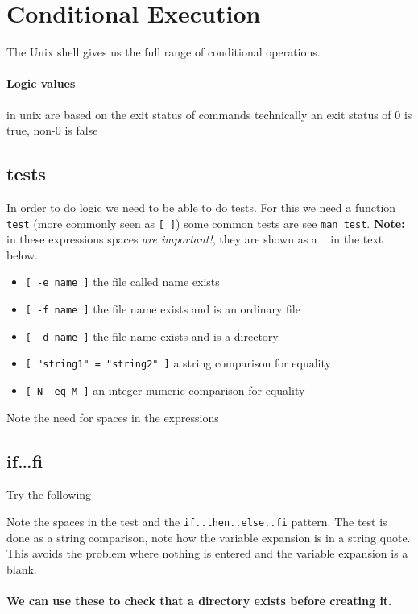 \documentclass[12pt,a4paper]{article}
\begin{document}
\section{Conditional Execution}
The Unix shell gives us the full range of conditional operations.

\paragraph{Logic values} in unix are based on the exit status of
commands technically an exit status of 0 is true, non-0 is
  false

\subsection{tests}
In order to do logic we need to be able to do tests.  For this we need
a function \texttt{test} (more commonly seen as \texttt{[ ]}) some
common tests are see \texttt{man test}.  \textbf{Note:} in these expressions
spaces \emph{are important!}, they are shown as a \verb' ' in the text below.
\begin{itemize}
\item \verb*:[ -e name ]: the file called name exists
\item \verb*:[ -f name ]: the file name exists and is an ordinary file
\item \verb*:[ -d name ]: the file name exists and is a directory
\item \verb*:[ "string1" = "string2" ]: a string comparison for equality
\item \verb*:[ N -eq M ]: an integer numeric comparison for equality
\end{itemize}
Note the need for spaces in the expressions

\subsection{if\ldots fi}
Try the following
\begin{code}
\end{code}
Note the spaces in the test and the \texttt{if..then..else..fi}
pattern.  The test is done as a string comparison, note how the
variable expansion is in a string quote.  This avoids the problem
where nothing is entered and the variable expansion is a blank.

\paragraph{We can use these to check that a directory exists before creating it.}

\end{document}

